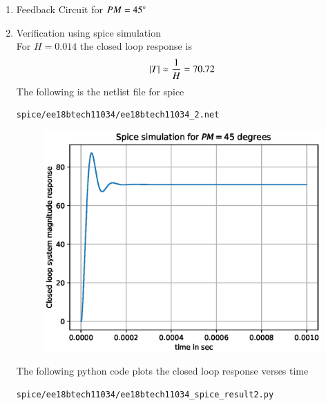 \begin{enumerate}[label=\arabic*.,ref=\theenumi]
\item Feedback Circuit for $PM = 45\degree$\\
\solution
\begin{figure}[ht!]
	\begin{center}
		\resizebox{\columnwidth}{!}{}
	\end{center}
	\caption{}
	\label{fig:ee18btech11034_fige}
\end{figure}
\item Verification using spice simulation\\
\solution For $H=0.014$ the closed loop response is
\begin{align}
\left\vert T\right\vert \approx \frac{1}{H} = 70.72
\end{align}
The following is the netlist file for spice
\begin{lstlisting}
spice/ee18btech11034/ee18btech11034_2.net
\end{lstlisting}
\begin{figure}[!h]
\centering
\includegraphics[width=\columnwidth]{./figs/ee18btech11034/ee18btech11034_spice_result2.eps}
\caption{}
\label{fig:ee18btech11034_spice_result2}
\end{figure}
The following python code plots the closed loop response verses time
\begin{lstlisting}
spice/ee18btech11034/ee18btech11034_spice_result2.py
\end{lstlisting}
\end{enumerate}
